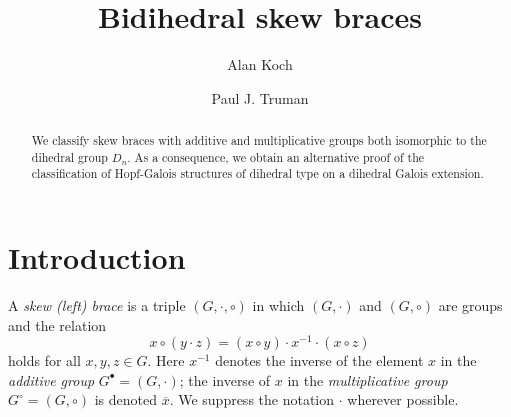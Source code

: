 \documentclass[reqno]{amsart}
\theoremstyle{definition}
\renewcommand{\bar}{\overline}
\begin{document}
\title[Bidihedral skew braces]{Bidihedral skew braces}

\author{Alan Koch}
\address{Department of Mathematics, Agnes Scott College, 141 E. College Ave., Decatur, GA 30030 USA}

\author{Paul J. Truman}
\address{School of Computer Science and Mathematics \\ Keele University \\ Staffordshire \\ ST5 5BG \\ UK}




\begin{abstract}
We classify skew braces with additive and multiplicative groups both isomorphic to the dihedral group $ D_{n} $. As a consequence, we obtain an alternative proof of the classification of Hopf-Galois structures of dihedral type on a dihedral Galois extension. 
\end{abstract}

\maketitle

\section{Introduction} \label{sec_introduction}

A \textit{skew (left) brace} \cite{GV17} is a triple $ (G,\cdot,\circ) $ in which $ (G,\cdot) $ and $ (G,\circ) $ are groups and the relation
\begin{equation} \label{eqn_brace_relation}
x \circ (y \cdot z) = (x \circ y) \cdot x^{-1} \cdot (x \circ z) 
\end{equation}
holds for all $ x,y,z \in G $. Here $ x^{-1} $ denotes the inverse of the element $ x $ in the \textit{additive group} $ G^{\bullet} = (G,\cdot) $; the inverse of $ x $ in the \textit{multiplicative group} $ G^{\circ} = (G,\circ) $ is denoted $ \bar{x} $. We suppress the notation $ \cdot $ wherever possible. 
\end{document}
